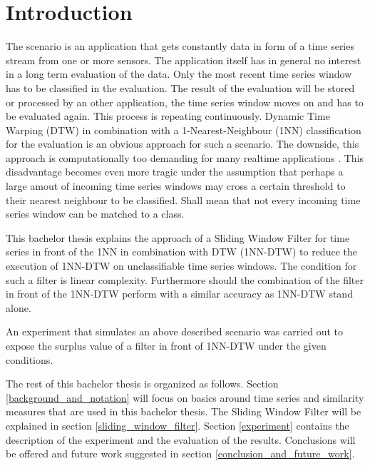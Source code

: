 \section{Introduction}
The scenario is an application that gets constantly data in form of a time series stream from one or more sensors. The
application itself has in general no interest in a long term evaluation of the data. Only the most recent time series
window has to be classified in the evaluation. The result of the evaluation will be stored or processed by an other
application, the time series window moves on and has to be evaluated again. This process is repeating continuously.
Dynamic Time Warping (DTW) in combination with a 1-Nearest-Neighbour (1NN) classification for the evaluation is an
obvious approach for such a scenario. The downside, this approach is computationally too demanding for many realtime
applications \cite{xi2006fast}. This disadvantage becomes even more tragic under the assumption that perhaps a large
amout of incoming time series windows may cross a certain threshold to their nearest neighbour to be classified. Shall
mean that not every incoming time series window can be matched to a class.

This bachelor thesis explains the approach of a Sliding Window Filter for time series in front of the 1NN in combination
with DTW (1NN-DTW) to reduce the execution of 1NN-DTW on unclassifiable time series windows. The condition for such a
filter is linear complexity. Furthermore should the combination of the filter in front of the 1NN-DTW perform with a
similar accuracy as 1NN-DTW stand alone.

An experiment that simulates an above described scenario was carried out to expose the surplus value
of a filter in front of 1NN-DTW under the given conditions.

The rest of this bachelor thesis is organized  as follows. Section \ref{background_and_notation} will focus on basics
around time series and similarity measures that are used in this bachelor thesis. The Sliding Window Filter will be
explained in section \ref{sliding_window_filter}. Section \ref{experiment} contains the description of the experiment
and the evaluation of the results. Conclusions will be offered and future work suggested in section
\ref{conclusion_and_future_work}.
